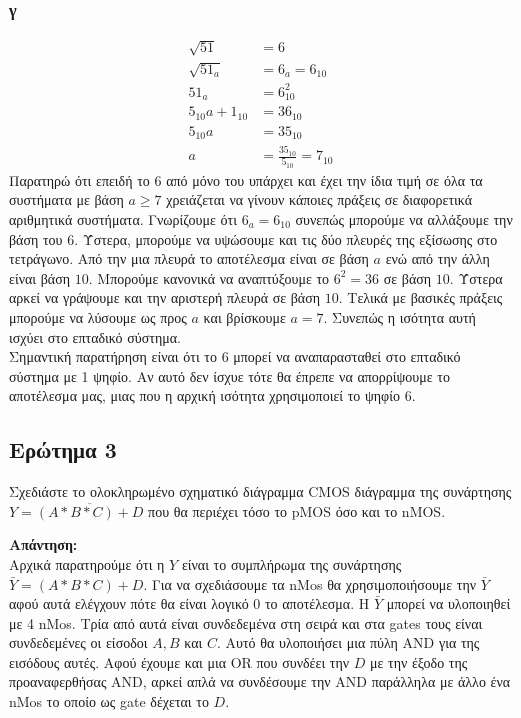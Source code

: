 \documentclass[]{article}
\begin{document}
\subsubsection{γ}
\begin{align*}
	\sqrt{51}        & = 6                               \\
	\sqrt{51_a}      & = 6_a = 6_{10}                    \\
	51_a             & = 6_{10}^2                        \\
	5_{10}a + 1_{10} & = 36_{10}                         \\
	5_{10}a          & = 35_{10}                         \\
	a                & = \frac{35_{10}}{5_{10}} = 7_{10}
\end{align*}
Παρατηρώ ότι επειδή το $6$ από μόνο του υπάρχει και έχει την ίδια τιμή σε όλα τα συστήματα με βάση $a \ge 7$ χρειάζεται να γίνουν κάποιες πράξεις σε διαφορετικά αριθμητικά συστήματα.
Γνωρίζουμε ότι $6_a = 6_{10}$ συνεπώς μπορούμε να αλλάξουμε την βάση του $6$. Ύστερα, μπορούμε να υψώσουμε και τις δύο πλευρές της εξίσωσης στο τετράγωνο. Από την μια πλευρά το αποτέλεσμα είναι σε βάση $a$ ενώ από την άλλη είναι βάση $10$.
Μπορούμε κανονικά να αναπτύξουμε το $6^2 = 36$ σε βάση $10$. Ύστερα αρκεί να γράψουμε και την αριστερή πλευρά σε βάση $10$. Τελικά με βασικές πράξεις μπορούμε να λύσουμε ως προς $a$ και βρίσκουμε $a = 7$.
Συνεπώς η ισότητα αυτή ισχύει στο επταδικό σύστημα. \\
Σημαντική παρατήρηση είναι ότι το $6$ μπορεί να αναπαρασταθεί στο επταδικό σύστημα με 1 ψηφίο. Αν αυτό δεν ίσχυε τότε θα έπρεπε να απορρίψουμε το αποτέλεσμα μας, μιας που η αρχική ισότητα χρησιμοποιεί το ψηφίο $6$.

\newpage

\subsection{Ερώτημα 3}
Σχεδιάστε το ολοκληρωμένο σχηματικό διάγραμμα CMOS διάγραμμα της συνάρτησης $Y=\overline{(A * B * C) + D}$ που θα περιέχει τόσο το pMOS όσο και το nMOS.

\textbf{Απάντηση: }\\
Αρχικά παρατηρούμε ότι η $Y$ είναι το συμπλήρωμα της συνάρτησης $\bar{Y} = (A * B * C) + D$.
Για να σχεδιάσουμε τα nMos θα χρησιμοποιήσουμε την $\bar{Y}$ αφού αυτά ελέγχουν πότε θα είναι λογικό 0 το αποτέλεσμα.
Η $\bar{Y}$ μπορεί να υλοποιηθεί με 4 nMos. Τρία από αυτά είναι συνδεδεμένα στη σειρά και στα gates τους είναι συνδεδεμένες οι είσοδοι $A, B$ και $C$.
Αυτό θα υλοποιήσει μια πύλη AND για της εισόδους αυτές. Αφού έχουμε και μια OR που συνδέει την $D$ με την έξοδο της προαναφερθήσας AND,
αρκεί απλά να συνδέσουμε την AND παράλληλα με άλλο ένα nMos το οποίο ως gate δέχεται το $D$.
\end{document}
